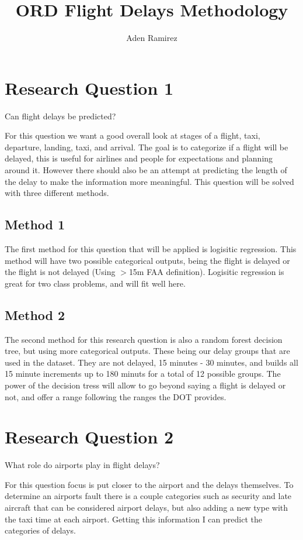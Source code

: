 \documentclass[a4paper,12pt]{article}
\begin{document}
\title{ORD Flight Delays Methodology}
\author{Aden Ramirez}
\maketitle

\pagebreak

\section{Research Question 1}
Can flight delays be predicted?

For this question we want a good overall look at stages of a flight, taxi, departure, landing, taxi, and arrival. The goal is to categorize if a flight will be delayed,
this is useful for airlines and people for expectations and planning around it. However there should also be an attempt at predicting the length of the delay to make 
the information more meaningful. This question will be solved with three different methods.

\subsection{Method 1}

The first method for this question that will be applied is logisitic regression. This method will have two possible categorical outputs, being the flight is delayed
or the flight is not delayed (Using $>$15m FAA definition). Logisitic regression is great for two class problems, and will fit well here.

\subsection{Method 2}
The second method for this research question is also a random forest decision tree, but using more categorical outputs. These being our delay groups that are used in the dataset. They are not delayed, 15 minutes - 30 minutes, and builds all 15 minute increments
up to 180 minuts for a total of 12 possible groups. The power of the decision tress will allow to go beyond saying a flight is delayed or not, and offer a range following
the ranges the DOT provides.

\section{Research Question 2}
What role do airports play in flight delays?

For this question focus is put closer to the airport and the delays themselves. To determine an airports fault there is a couple categories such as security and late aircraft that can be considered airport delays,
but also adding a new type with the taxi time at each airport. Getting this information I can predict the categories of delays.
\end{document}

